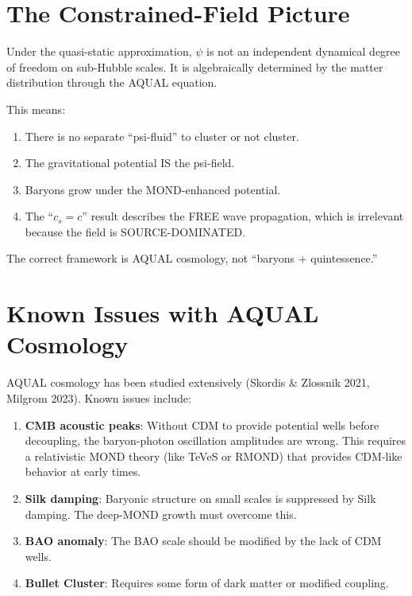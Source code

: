 \documentclass[11pt]{article}
\begin{document}
\section{The Constrained-Field Picture}

Under the quasi-static approximation, $\psi$ is not an independent
dynamical degree of freedom on sub-Hubble scales. It is algebraically
determined by the matter distribution through the AQUAL equation.

This means:
\begin{enumerate}
\item There is no separate ``psi-fluid'' to cluster or not cluster.
\item The gravitational potential IS the psi-field.
\item Baryons grow under the MOND-enhanced potential.
\item The ``$c_s = c$'' result describes the FREE wave propagation,
  which is irrelevant because the field is SOURCE-DOMINATED.
\end{enumerate}

The correct framework is AQUAL cosmology, not ``baryons + quintessence.''

\section{Known Issues with AQUAL Cosmology}

AQUAL cosmology has been studied extensively (Skordis \& Zlossnik 2021,
Milgrom 2023). Known issues include:
\begin{enumerate}
\item \textbf{CMB acoustic peaks}: Without CDM to provide potential
  wells before decoupling, the baryon-photon oscillation amplitudes
  are wrong. This requires a relativistic MOND theory (like TeVeS or
  RMOND) that provides CDM-like behavior at early times.

\item \textbf{Silk damping}: Baryonic structure on small scales is
  suppressed by Silk damping. The deep-MOND growth must overcome this.

\item \textbf{BAO anomaly}: The BAO scale should be modified by the
  lack of CDM wells.

\item \textbf{Bullet Cluster}: Requires some form of dark matter or
  modified coupling.
\end{enumerate}
\end{document}
